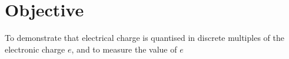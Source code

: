 \section{Objective}

To demonstrate that
electrical charge is quantised in discrete multiples of
the electronic charge $e$, and to measure the value of
$e$
